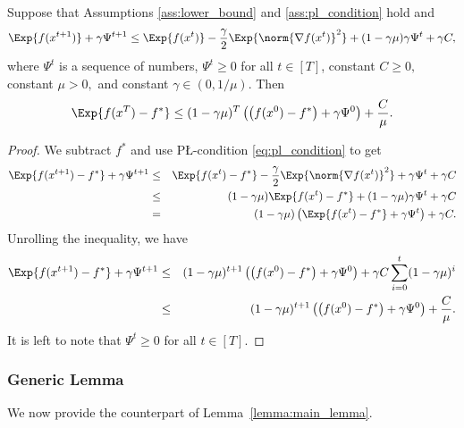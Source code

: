\documentclass{article}
\begin{document}
\begin{lemma}
  \label{lemma:good_recursion_pl}
  Suppose that Assumptions \ref{ass:lower_bound} and \ref{ass:pl_condition} hold and
  \begin{align*}
      \Exp{f(x^{t+1})} + \gamma \Psi^{t+1} \leq \Exp{f(x^t)} - \frac{\gamma}{2}\Exp{\norm{\nabla f(x^t)}^2} + (1 - \gamma \mu)\gamma \Psi^{t} + \gamma C,
  \end{align*}
  where $\Psi^{t}$ is a sequence of numbers, $\Psi^{t} \geq 0$ for all $t \in [T]$, constant $C \geq 0,$ constant $\mu > 0,$ and constant $\gamma \in (0, 1 / \mu).$ Then 
  \begin{align}
      \label{eq:good_recursion_pl}
      \Exp{f(x^{T}) - f^*} \leq (1 - \gamma \mu)^{T}\left(\left(f(x^0) - f^*\right) + \gamma \Psi^{0}\right) + \frac{C}{\mu}.
  \end{align}
\end{lemma}

\begin{proof}
  We subtract $f^*$ and use P\L-condition \eqref{eq:pl_condition} to get
  \begin{eqnarray*}
      \Exp{f(x^{t+1}) - f^*} + \gamma \Psi^{t+1} &\leq& \Exp{f(x^t) - f^*} - \frac{\gamma}{2}\Exp{\norm{\nabla f(x^t)}^2} + \gamma \Psi^{t} + \gamma C \\
      &\leq& (1 - \gamma \mu)\Exp{f(x^t) - f^*} + (1 - \gamma \mu)\gamma \Psi^{t} + \gamma C \\
      &=& (1 - \gamma \mu)\left(\Exp{f(x^t) - f^*} + \gamma \Psi^{t}\right) + \gamma C.
  \end{eqnarray*}
  Unrolling the inequality, we have
  \begin{eqnarray*}
      \Exp{f(x^{t+1}) - f^*} + \gamma \Psi^{t+1} &\leq& (1 - \gamma \mu)^{t+1}\left(\left(f(x^0) - f^*\right) + \gamma \Psi^{0}\right) + \gamma C \sum_{i = 0}^{t} (1 - \gamma \mu)^i \\
      &\leq& (1 - \gamma \mu)^{t+1}\left(\left(f(x^0) - f^*\right) + \gamma \Psi^{0}\right) + \frac{C}{\mu}.
  \end{eqnarray*}
  It is left to note that $\Psi^{t} \geq 0$ for all $t \in [T]$.
\end{proof}

\subsubsection{Generic Lemma}
We now provide the counterpart of Lemma~\ref{lemma:main_lemma}.
\end{document}
